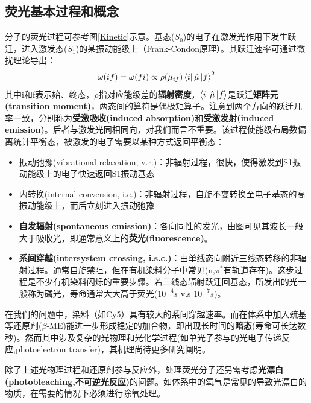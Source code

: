 \documentclass[12pt]{ctexart}
\begin{document}
\subsection*{荧光基本过程和概念}
\par 分子的荧光过程可参考图\ref{Kinetic}示意。基态($S_0$)的电子在激发光作用下发生跃迁，进入激发态($S_1$)的某振动能级上（Frank-Condon原理）。其跃迁速率可通过微扰理论导出：
\begin{equation}
    \omega(if)=\omega(fi)\propto \rho(\mu_{if})\bra{i}\hat{\mu}\ket{f}^2
    \label{pert}
\end{equation}
其中i和f表示始、终态，$\rho$指对应能级差的\textbf{辐射密度}，$\bra{i}\hat{\mu}\ket{f}$是跃迁\textbf{矩阵元(transition moment)}，两态间的算符是偶极矩算子。注意到两个方向的跃迁几率一致，分别称为\textbf{受激吸收(induced absorption)}和\textbf{受激发射(induced emission)}。后者与激发光同相同向，对我们而言不重要。该过程使能级布局数偏离统计平衡态，被激发的电子需要以某种方式返回平衡态：
\begin{itemize}
    \item 振动弛豫(vibrational relaxation, v.r.)：非辐射过程，很快，使得激发到S1振动能级上的电子快速返回S1振动基态
    \item 内转换(internal conversion, i.c.)：非辐射过程，自旋不变转换至电子基态的高振动能级上，而后立刻进入振动弛豫
    \item \textbf{自发辐射(spontaneous emission)}：各向同性的发光，由图可见其波长一般大于吸收光，即通常意义上的\textbf{荧光(fluorescence)}。
    \item \textbf{系间穿越(intersystem crossing, i.s.c.)}：由单线态向附近三线态转移的非辐射过程。通常自旋禁阻，但在有机染料分子中常见(n,$\pi^*有轨道存在$)。这步过程是不少有机染料闪烁的重要步骤。若三线态辐射跃迁回基态，所发出的光一般称为磷光，寿命通常大大高于荧光($10^{-4}s$ v.s $10^{-7}s)$。
\end{itemize}
在我们的问题中，染料（如Cy5）具有较大的系间穿越速率。而在体系中加入巯基等还原剂($\beta$-ME)能进一步形成稳定的加合物，即出现长时间的\textbf{暗态}(寿命可长达数秒)。然而其中涉及复杂的光物理和光化学过程(如单光子参与的光电子传递反应,photoelectron transfer)，其机理尚待更多研究阐明。
\par 除了上述光物理过程和还原剂参与反应外，处理荧光分子还另需考虑\textbf{光漂白(photobleaching,不可逆光反应)}的问题。如体系中的氧气是常见的导致光漂白的物质，在需要的情况下必须进行除氧处理。
\end{document}
